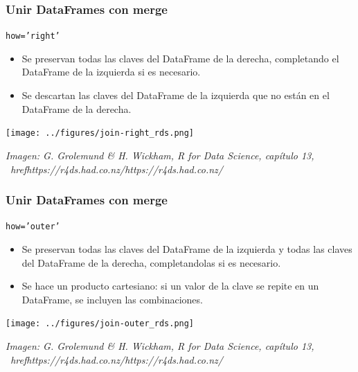 \documentclass[9pt]{beamer}
\begin{document}
\begin{frame}
  \frametitle{Unir DataFrames con merge}
  \begin{block}{\tt how='right'}
    \begin{itemize}
    \item Se preservan todas las claves del DataFrame de la derecha, completando el DataFrame de la izquierda si es necesario. 
    \item Se descartan las claves del DataFrame de la izquierda que no están en el DataFrame de la derecha.
    \end{itemize}
  \end{block}
         \begin{center}
           \texttt{[image: ../figures/join-right\_rds.png]}\smallskip
           
           \textit{\footnotesize Imagen: G. Grolemund \& H. Wickham, R for Data Science, capítulo 13, \ href{https://r4ds.had.co.nz/}{https://r4ds.had.co.nz/}}
      \end{center}
\end{frame}

\begin{frame}
  \frametitle{Unir DataFrames con merge}
  \begin{block}{\tt how='outer'}
    \begin{itemize}
    \item Se preservan todas las claves del DataFrame de la izquierda y todas las claves del DataFrame de la derecha, completandolas si es necesario. 
    \item Se hace un producto cartesiano: si un valor de la clave se repite en un DataFrame, se incluyen las combinaciones.
    \end{itemize}
  \end{block}
         \begin{center}
           \texttt{[image: ../figures/join-outer\_rds.png]}\smallskip
           
           \textit{\footnotesize Imagen: G. Grolemund \& H. Wickham, R for Data Science, capítulo 13, \ href{https://r4ds.had.co.nz/}{https://r4ds.had.co.nz/}}
      \end{center}
\end{frame}
\end{document}
